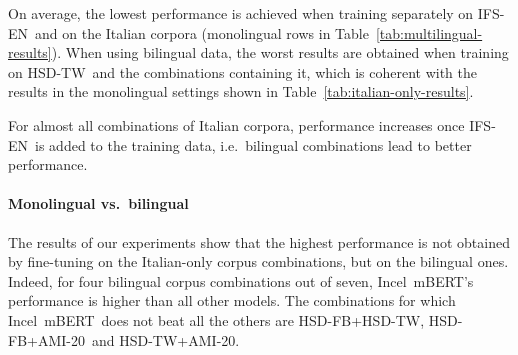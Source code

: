 \documentclass[11pt]{article}
\newcommand{\dsENclassification}{IFS-EN}
\newcommand{\dsITclassification}{IFS-IT}
\newcommand{\mbert}{\mbox{mBERT$_{base}$}}
\newcommand{\imbert}{\mbox{Incel mBERT}}
\newcommand{\hsdfb}{\mbox{HSD-FB}}
\newcommand{\hsdtw}{\mbox{HSD-TW}}
\newcommand{\ami}{\mbox{AMI-20}}
\begin{document}
On average, the lowest performance is achieved when training separately on \dsENclassification\, and on the Italian corpora (monolingual rows in Table~\ref{tab:multilingual-results}). When using bilingual data, the worst results are obtained when training on \hsdtw\, and the combinations containing it, which is coherent with the results in the monolingual settings shown in \mbox{Table~\ref{tab:italian-only-results}}.

For almost all combinations of Italian corpora, performance increases once \dsENclassification\, is added to the training data, i.e.\, bilingual combinations lead to better performance.


\paragraph{Monolingual vs.\ bilingual}
The results of our experiments show that the highest performance is not obtained by fine-tuning on the Italian-only corpus combinations, but on the bilingual ones. Indeed, for four bilingual corpus combinations out of seven, \imbert's performance is higher than all other models.
The combinations for which \imbert\, does not beat all the others are \hsdfb+\hsdtw, \hsdfb+\ami\, and \hsdtw+\ami.
\end{document}
